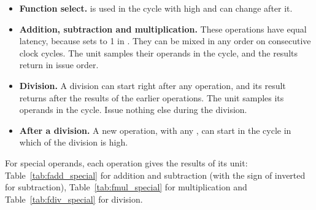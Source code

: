 \begin{itemize}
\item \textbf{Function select.}  is used in the cycle with
   high and can change after it.
\item \textbf{Addition, subtraction and multiplication.} These operations have
  equal latency, because  sets  to 1 in . They can
  be mixed in any order on consecutive clock cycles. The unit samples their
  operands in the  cycle, and the results return in issue order.
\item \textbf{Division.} A division can start right after any operation, and
  its result returns after the results of the earlier operations. The unit samples
  its operands in the  cycle. Issue nothing else during the
  division.
\item \textbf{After a division.} A new operation, with any , can start
  in the cycle in which  of the division is high.
\end{itemize}

For special operands, each operation gives the results of its unit:
Table~\ref{tab:fadd_special} for addition and subtraction (with the sign of
 inverted for subtraction), Table~\ref{tab:fmul_special} for
multiplication and Table~\ref{tab:fdiv_special} for division.
